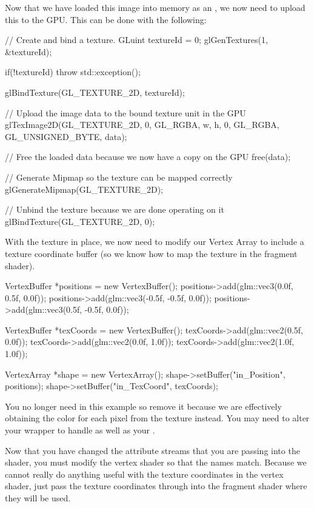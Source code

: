 \documentclass[10pt]{article}
\begin{document}
Now that we have loaded this image into memory as an , we now need to upload this to the GPU.
This can be done with the following:

\begin{Code}

// Create and bind a texture.
GLuint textureId = 0;
glGenTextures(1, &textureId);

if(!textureId)
{
  throw std::exception();
}

glBindTexture(GL_TEXTURE_2D, textureId);

// Upload the image data to the bound texture unit in the GPU
glTexImage2D(GL_TEXTURE_2D, 0, GL_RGBA, w, h, 0, GL_RGBA,
  GL_UNSIGNED_BYTE, data);

// Free the loaded data because we now have a copy on the GPU
free(data);

// Generate Mipmap so the texture can be mapped correctly
glGenerateMipmap(GL_TEXTURE_2D);

// Unbind the texture because we are done operating on it
glBindTexture(GL_TEXTURE_2D, 0);

\end{Code}

With the texture in place, we now need to modify our Vertex Array to include a texture coordinate buffer
(so we know how to map the texture in the fragment shader).

\begin{Code}
  VertexBuffer *positions = new VertexBuffer();
  positions->add(glm::vec3(0.0f, 0.5f, 0.0f));
  positions->add(glm::vec3(-0.5f, -0.5f, 0.0f));
  positions->add(glm::vec3(0.5f, -0.5f, 0.0f));

  VertexBuffer *texCoords = new VertexBuffer();
  texCoords->add(glm::vec2(0.5f, 0.0f));
  texCoords->add(glm::vec2(0.0f, 1.0f));
  texCoords->add(glm::vec2(1.0f, 1.0f));

  VertexArray *shape = new VertexArray();
  shape->setBuffer("in_Position", positions);
  shape->setBuffer("in_TexCoord", texCoords);
\end{Code}

You no longer need  in this example so remove it because we
are effectively obtaining the color for each pixel from the texture
instead.  You may need to alter your  wrapper to handle
 as well as your .

Now that you have changed the attribute streams that you are passing
into the shader, you must modify the vertex shader so that the names
match. Because we cannot really do anything useful with the texture
coordinates in the vertex shader, just pass the texture coordinates
through into the fragment shader where they will be used.
\end{document}
